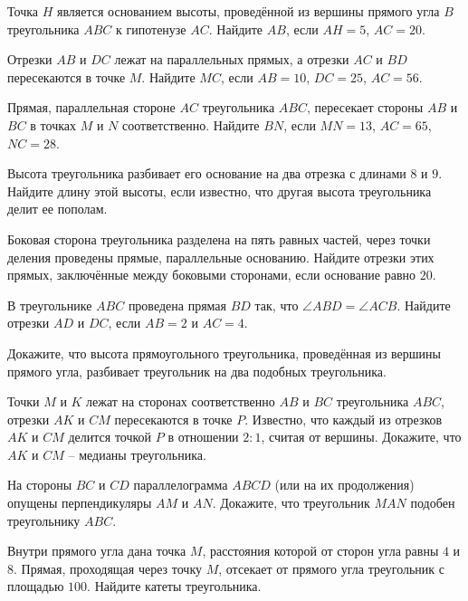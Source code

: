 \begin{class}[number=4]
	\begin{listofex}
		\item Точка \( H \) является основанием высоты, проведённой из вершины прямого угла \( B \) треугольника \( ABC \) к гипотенузе \( AC \). Найдите \( AB \), если \( AH = 5 \), \( AC = 20 \).
		\item  Отрезки \( AB \) и \( DC \) лежат на параллельных прямых, а отрезки \( AC \) и \( BD \) пересекаются в точке \( M \). Найдите \( MC \), если \( AB = 10 \), \( DC = 25 \), \( AC = 56  \).
		\item Прямая, параллельная стороне \( AC \) треугольника \( ABC \), пересекает стороны \( AB \) и \( BC \) в точках \( M \) и \( N \) соответственно. Найдите \( BN \), если \( MN = 13 \), \( AC = 65 \), \( NC = 28 \).
		\item Высота треугольника разбивает его основание на два отрезка с длинами \( 8 \) и \( 9 \). Найдите длину этой высоты, если известно, что другая высота треугольника делит ее пополам.
		\item Боковая сторона треугольника разделена на пять равных частей, через точки деления проведены прямые, параллельные основанию.
		Найдите отрезки этих прямых, заключённые между боковыми сторонами, если основание равно \( 20 \).
		\item В треугольнике \( ABC \) проведена прямая \( BD \) так, что  \(  \angle ABD = \angle ACB \).  Найдите отрезки \( AD \) и \( DC \), если  \( AB = 2   \) и  \( AC = 4 \).
		\item Докажите, что высота прямоугольного треугольника, проведённая из вершины прямого угла, разбивает треугольник на два подобных треугольника.
		\item Точки \( M \) и \( K \) лежат на сторонах соответственно \( AB \) и \( BC \) треугольника \( ABC \), отрезки \( AK \) и \( CM \) пересекаются в точке \( P \). Известно, что каждый из отрезков \( AK \) и \( CM \) делится точкой \( P \) в отношении  \( 2 : 1 \),  считая от вершины. Докажите, что \( AK \) и \( CM \) – медианы треугольника.
		\item На стороны \( BC \) и \( CD \) параллелограмма \( ABCD \) (или на их продолжения) опущены перпендикуляры \( AM \) и \( AN \).
		Докажите, что треугольник \( MAN \) подобен треугольнику \( ABC \).
		\item Внутри прямого угла дана точка \( M \), расстояния которой от сторон угла равны \( 4 \) и \( 8 \). Прямая, проходящая через точку \( M \), отсекает от прямого угла треугольник с площадью \( 100 \). Найдите катеты треугольника.
	\end{listofex}
\end{class}

